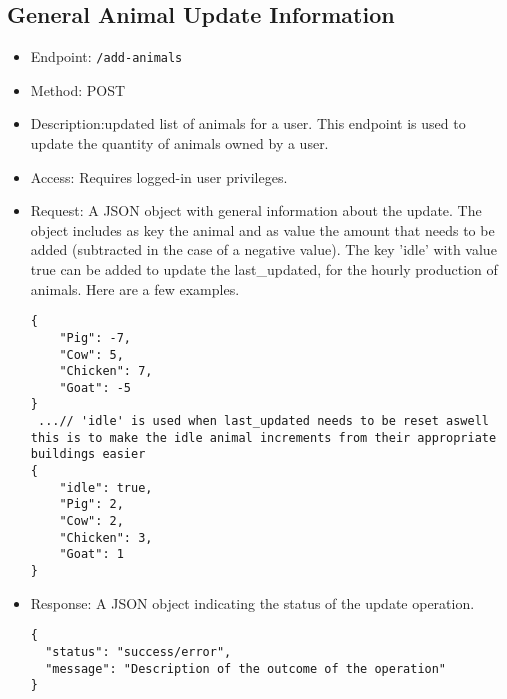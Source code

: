 \documentclass[12pt]{article}
\begin{document}
\subsection{General Animal Update Information}
\begin{itemize}
    \item Endpoint: \texttt{/add-animals}
    \item Method: POST
    \item Description:updated list of animals for a user. This endpoint is used to update the quantity of animals owned by a user.
    \item Access: Requires logged-in user privileges.
    \item Request: A JSON object with general information about the update.
    The object includes as key the animal and as value the amount that needs to be added (subtracted in the case of a negative value). The key 'idle' with value true can be added to update the last_updated, for the hourly production of animals. Here are a few examples.
    \begin{verbatim}
{
    "Pig": -7,
	"Cow": 5,
	"Chicken": 7,
	"Goat": -5
}
 ...// 'idle' is used when last_updated needs to be reset aswell this is to make the idle animal increments from their appropriate buildings easier
{
    "idle": true,
    "Pig": 2,
	"Cow": 2,
	"Chicken": 3,
	"Goat": 1
}

    \end{verbatim}
    \item Response: A JSON object indicating the status of the update operation.
    \begin{verbatim}
{
  "status": "success/error",
  "message": "Description of the outcome of the operation"
}
    \end{verbatim}
\end{itemize}
\end{document}
